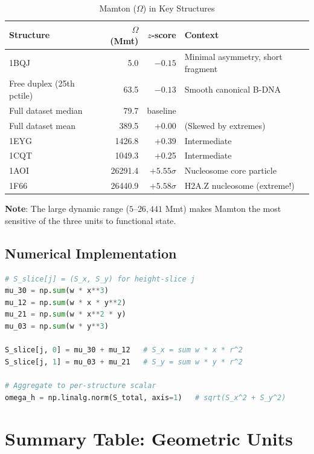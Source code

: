 \begin{table}[h]
    \centering
    \caption{Mamton ($\Omega$) in Key Structures}
    \begin{tabular}{lrrl}
        \toprule
        \textbf{Structure} & \textbf{$\Omega$ (Mmt)} & \textbf{$z$-score} & \textbf{Context} \\
        \midrule
        1BQJ & 5.0 & $-0.15$ & Minimal asymmetry, short fragment \\
        Free duplex (25th pctile) & 63.5 & $-0.13$ & Smooth canonical B-DNA \\
        Full dataset median & 79.7 & baseline & \\
        Full dataset mean & 389.5 & +0.00 & (Skewed by extremes) \\
        1EYG & 1426.8 & +0.39 & Intermediate \\
        1CQT & 1049.3 & +0.25 & Intermediate \\
        1AOI & 26291.4 & $+5.55\sigma$ & Nucleosome core particle \\
        1F66 & 26440.9 & $+5.58\sigma$ & H2A.Z nucleosome (extreme!) \\
        \bottomrule
    \end{tabular}
\end{table}

\textbf{Note}: The large dynamic range ($5$--$26{,}441$ Mmt) makes Mamton the most sensitive of the three units to functional state.

\subsection{Numerical Implementation}

\begin{lstlisting}[language=Python, caption=Mamton computation (from sht\_dna\_analysis.py)]
# S_slice[j] = (S_x, S_y) for height-slice j
mu_30 = np.sum(w * x**3)
mu_12 = np.sum(w * x * y**2)
mu_21 = np.sum(w * x**2 * y)
mu_03 = np.sum(w * y**3)

S_slice[j, 0] = mu_30 + mu_12   # S_x = sum w * x * r^2
S_slice[j, 1] = mu_03 + mu_21   # S_y = sum w * y * r^2

# Aggregate to per-structure scalar
omega_h = np.linalg.norm(S_total, axis=1)   # sqrt(S_x^2 + S_y^2)
\end{lstlisting}


\section{Summary Table: Geometric Units}

